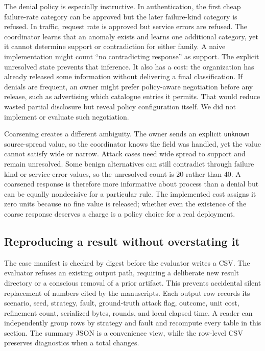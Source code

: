 The denial policy is especially instructive. In authentication, the first cheap failure-rate category can be approved but the later failure-kind category is refused. In traffic, request rate is approved but service errors are refused. The coordinator learns that an anomaly exists and learns one additional category, yet it cannot determine support or contradiction for either family. A naive implementation might count ``no contradicting response'' as support. The explicit unresolved state prevents that inference. It also has a cost: the organization has already released some information without delivering a final classification. If denials are frequent, an owner might prefer policy-aware negotiation before any release, such as advertising which catalogue entries it permits. That would reduce wasted partial disclosure but reveal policy configuration itself. We did not implement or evaluate such negotiation.

Coarsening creates a different ambiguity. The owner sends an explicit \texttt{unknown} source-spread value, so the coordinator knows the field was handled, yet the value cannot satisfy wide or narrow. Attack cases need wide spread to support and remain unresolved. Some benign alternatives can still contradict through failure kind or service-error values, so the unresolved count is 20 rather than 40. A coarsened response is therefore more informative about process than a denial but can be equally nondecisive for a particular rule. The implemented cost assigns it zero units because no fine value is released; whether even the existence of the coarse response deserves a charge is a policy choice for a real deployment.

\subsection{Reproducing a result without overstating it}
The case manifest is checked by digest before the evaluator writes a CSV. The evaluator refuses an existing output path, requiring a deliberate new result directory or a conscious removal of a prior artifact. This prevents accidental silent replacement of numbers cited by the manuscripts. Each output row records its scenario, seed, strategy, fault, ground-truth attack flag, outcome, unit cost, refinement count, serialized bytes, rounds, and local elapsed time. A reader can independently group rows by strategy and fault and recompute every table in this section. The summary JSON is a convenience view, while the row-level CSV preserves diagnostics when a total changes.

